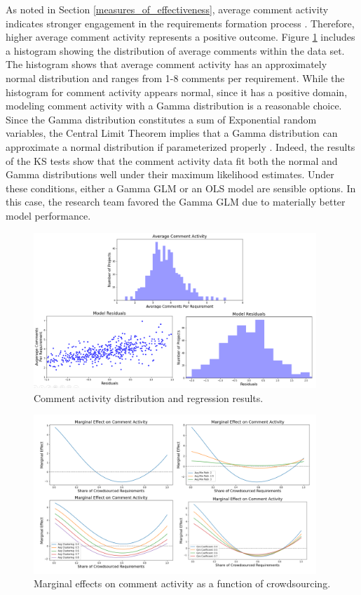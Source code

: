 As noted in Section \ref{measures_of_effectiveness}, average comment activity indicates stronger engagement in the requirements formation process \cite{toral}. Therefore, higher average comment activity represents a positive outcome. Figure \ref{comment_activity_results} includes a histogram showing the distribution of average comments within the data set. The histogram shows that average comment activity has an approximately normal distribution and ranges from 1-8 comments per requirement. While the histogram for comment activity appears normal, since it has a positive domain, modeling comment activity with a Gamma distribution is a reasonable choice. Since the Gamma distribution constitutes a sum of Exponential random variables, the Central Limit Theorem implies that a Gamma distribution can approximate a normal distribution if parameterized properly \cite{wackerly}. Indeed, the results of the KS tests show that the comment activity data fit both the normal and Gamma distributions well under their maximum likelihood estimates. Under these conditions, either a Gamma GLM or an OLS model are sensible options. In this case, the research team favored the Gamma GLM due to materially better model performance.

\begin{figure}
  \includegraphics[width=0.95\textwidth]{comment_activity_results.PNG}
\caption{Comment activity distribution and regression results.}
\label{comment_activity_results}
\end{figure}

\begin{figure}
  \includegraphics[width=0.95\textwidth]{comment_activity_marginal.PNG}
\caption{Marginal effects on comment activity as a function of crowdsourcing.}
\label{comment_activity_marginal}
\end{figure}

